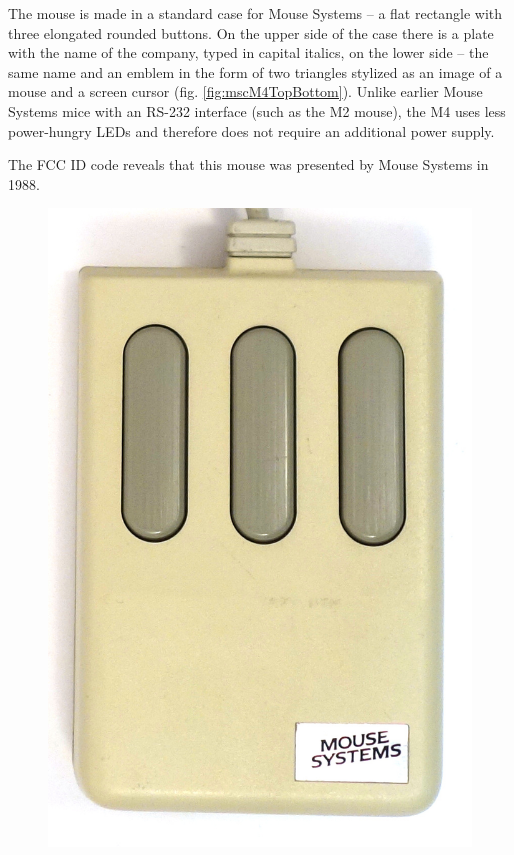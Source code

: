 \documentclass[11pt, a4paper]{article}
\begin{document}
The mouse is made in a standard case for Mouse Systems -- a flat rectangle with three elongated rounded buttons. On the upper side of the case there is a plate with the name of the company, typed in capital italics, on the lower side -- the same name and an emblem in the form of two triangles stylized as an image of a mouse and a screen cursor (fig. \ref{fig:mscM4TopBottom}). Unlike earlier Mouse Systems mice with an RS-232 interface (such as the M2 mouse), the M4 uses less power-hungry LEDs and therefore does not require an additional power supply.

The FCC ID code reveals that this mouse was presented by Mouse Systems in 1988.

\begin{figure}[h]
    \centering
    \includegraphics[scale=0.7]{1988_mouse_systems_m4/top_30.jpg}

\end{figure}
\end{document}
